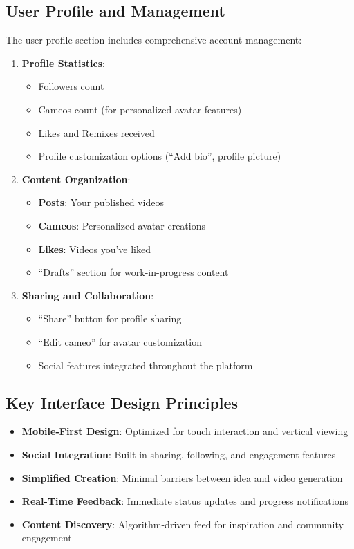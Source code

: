 \subsection{User Profile and Management}

The user profile section includes comprehensive account management:

\begin{enumerate}
\item \textbf{Profile Statistics}:
\begin{itemize}
\item Followers count
\item Cameos count (for personalized avatar features)
\item Likes and Remixes received
\item Profile customization options (``Add bio'', profile picture)
\end{itemize}

\item \textbf{Content Organization}:
\begin{itemize}
\item \textbf{Posts}: Your published videos
\item \textbf{Cameos}: Personalized avatar creations
\item \textbf{Likes}: Videos you've liked
\item ``Drafts'' section for work-in-progress content
\end{itemize}

\item \textbf{Sharing and Collaboration}:
\begin{itemize}
\item ``Share'' button for profile sharing
\item ``Edit cameo'' for avatar customization
\item Social features integrated throughout the platform
\end{itemize}
\end{enumerate}

\subsection{Key Interface Design Principles}

\begin{itemize}
\item \textbf{Mobile-First Design}: Optimized for touch interaction and vertical viewing
\item \textbf{Social Integration}: Built-in sharing, following, and engagement features
\item \textbf{Simplified Creation}: Minimal barriers between idea and video generation
\item \textbf{Real-Time Feedback}: Immediate status updates and progress notifications
\item \textbf{Content Discovery}: Algorithm-driven feed for inspiration and community engagement
\end{itemize}

